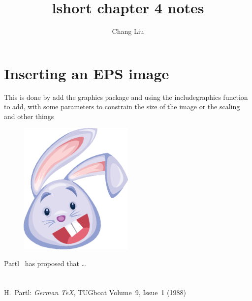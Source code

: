 \documentclass{article}
\author{Chang Liu}
\title{lshort chapter 4 notes}
\begin{document}
\maketitle

\newpage

\section{Inserting an EPS image}

This is done by add the graphics package and using the includegraphics function to add, with some parameters to constrain the size
of the image or the scaling and other things

\begin{figure}
\begin{center}
\includegraphics[angle=90, width=0.5\textwidth]{blue-rabbit}
\end{center}
\end{figure}


Partl~\cite{pa} has
proposed that \ldots


\section{}


\section{}

\begin{thebibliography}{99}
 H.~Partl:
\emph{German \TeX},
TUGboat Volume~9, Issue~1 (1988)
\end{thebibliography}
\end{document}
